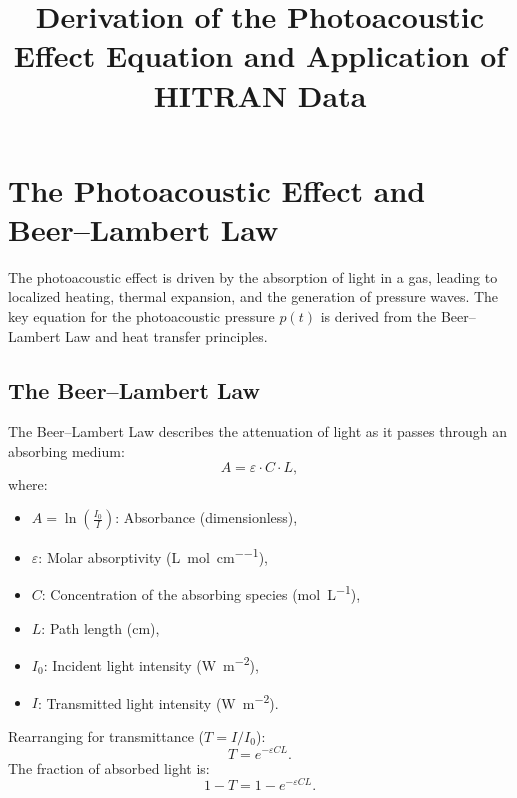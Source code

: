 \documentclass[12pt]{article}
\begin{document}
\title{Derivation of the Photoacoustic Effect Equation and Application of HITRAN Data}
\author{}
\date{}
\maketitle

\section{The Photoacoustic Effect and Beer–Lambert Law}
The photoacoustic effect is driven by the absorption of light in a gas, leading to localized heating, thermal expansion, and the generation of pressure waves. The key equation for the photoacoustic pressure \( p(t) \) is derived from the Beer–Lambert Law and heat transfer principles. 

\subsection{The Beer–Lambert Law}
The Beer–Lambert Law describes the attenuation of light as it passes through an absorbing medium:
\[
A = \varepsilon \cdot C \cdot L,
\]
where:
\begin{itemize}
    \item \( A = \ln\left(\frac{I_0}{I}\right) \): Absorbance (dimensionless),
    \item \( \varepsilon \): Molar absorptivity (\si{\liter\per\mole\per\centi\meter}),
    \item \( C \): Concentration of the absorbing species (\si{\mole\per\liter}),
    \item \( L \): Path length (\si{\centi\meter}),
    \item \( I_0 \): Incident light intensity (\si{\watt\per\meter\squared}),
    \item \( I \): Transmitted light intensity (\si{\watt\per\meter\squared}).
\end{itemize}

Rearranging for transmittance (\( T = I/I_0 \)):
\[
T = e^{-\varepsilon C L}.
\]
The fraction of absorbed light is:
\[
1 - T = 1 - e^{-\varepsilon C L}.
\]
\end{document}

